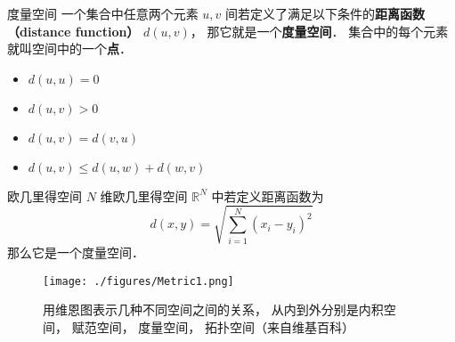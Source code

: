
\begin{definition}{度量空间}
一个集合中任意两个元素 $u, v$ 间若定义了满足以下条件的\textbf{距离函数（distance function）} $d(u, v)$， 那它就是一个\textbf{度量空间}． 集合中的每个元素就叫空间中的一个\textbf{点}．
\begin{itemize}
\item $d(u, u) = 0$
\item $d(u, v) > 0$
\item $d(u, v) = d(v, u)$
\item $d(u, v) \leqslant d(u, w) + d(w, v)$
\end{itemize}
\end{definition}

\begin{exercise}{欧几里得空间}
$N$ 维欧几里得空间 $\mathbb R^N$ 中若定义距离函数为
\begin{equation}
d(x, y) = \sqrt{\sum_{i=1}^N (x_i - y_i)^2}
\end{equation}
那么它是一个度量空间．
\end{exercise}

\begin{figure}[ht]
\centering
\texttt{[image: ./figures/Metric1.png]}
\caption{用维恩图表示几种不同空间之间的关系， 从内到外分别是内积空间， 赋范空间， 度量空间， 拓扑空间（来自维基百科）} \label{Metric_fig1}
\end{figure}
